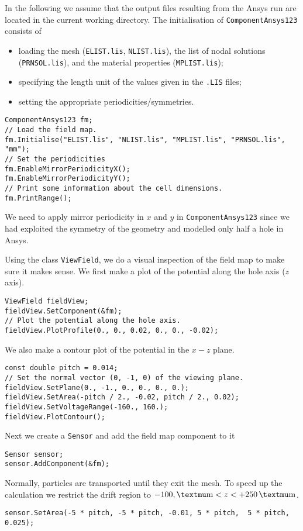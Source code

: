 In the following we assume that the output files resulting from the 
Ansys run are located in the current working directory.
The initialisation of \texttt{ComponentAnsys123} consists of 
\begin{itemize}
  \item
  loading the mesh (\texttt{ELIST.lis}, \texttt{NLIST.lis}), 
  the list of nodal solutions (\texttt{PRNSOL.lis}), and the 
  material properties (\texttt{MPLIST.lis});
  \item
  specifying the length unit of the values given in the 
  \texttt{.LIS} files;
  \item
  setting the appropriate periodicities/symmetries.
\end{itemize}
\begin{lstlisting}
ComponentAnsys123 fm;
// Load the field map.
fm.Initialise("ELIST.lis", "NLIST.lis", "MPLIST.lis", "PRNSOL.lis", "mm");
// Set the periodicities
fm.EnableMirrorPeriodicityX();
fm.EnableMirrorPeriodicityY();
// Print some information about the cell dimensions.
fm.PrintRange();
\end{lstlisting}
We need to apply mirror periodicity in $x$ and $y$
in \texttt{ComponentAnsys123} since we had exploited the symmetry 
of the geometry and modelled only half a hole in Ansys.

Using the class \texttt{ViewField}, we do a visual inspection of the 
field map to make sure it makes sense. 
We first make a plot of the potential along the hole axis ($z$ axis).
\begin{lstlisting}
ViewField fieldView;
fieldView.SetComponent(&fm);
// Plot the potential along the hole axis.
fieldView.PlotProfile(0., 0., 0.02, 0., 0., -0.02);
\end{lstlisting}
We also make a contour plot of the potential in the $x - z$ plane.
\begin{lstlisting}
const double pitch = 0.014;
// Set the normal vector (0, -1, 0) of the viewing plane.
fieldView.SetPlane(0., -1., 0., 0., 0., 0.);
fieldView.SetArea(-pitch / 2., -0.02, pitch / 2., 0.02);
fieldView.SetVoltageRange(-160., 160.);
fieldView.PlotContour();
\end{lstlisting}
Next we create a \texttt{Sensor} and add the field map 
component to it
\begin{lstlisting}
Sensor sensor;
sensor.AddComponent(&fm);
\end{lstlisting}
Normally, particles are transported until they exit the mesh. 
To speed up the calculation we restrict the drift region to 
$-100,\textmu\text{m} < z < +250\,\textmu\text{m}$.
\begin{lstlisting}
sensor.SetArea(-5 * pitch, -5 * pitch, -0.01, 5 * pitch,  5 * pitch,  0.025);
\end{lstlisting}
